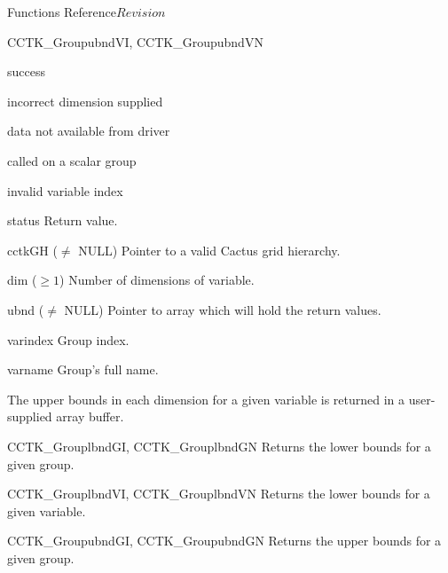 \begin{cactuspart}{ Functions Reference}{}{$Revision$}
\begin{FunctionDescription}{CCTK\_GroupubndVI, CCTK\_GroupubndVN}
\begin{ResultSection}
\begin{Result}{0} success \end{Result}
\begin{Result}{-1} incorrect dimension supplied \end{Result}
\begin{Result}{-2} data not available from driver \end{Result}
\begin{Result}{-3} called on a scalar group \end{Result}
\begin{Result}{-4} invalid variable index \end{Result}
\end{ResultSection}

\begin{ParameterSection}
\begin{Parameter}{status} Return value. \end{Parameter}
\begin{Parameter}{cctkGH ($\ne$ NULL)} Pointer to a valid Cactus grid hierarchy. \end{Parameter}
\begin{Parameter}{dim ($\ge 1$)} Number of dimensions of variable. \end{Parameter}
\begin{Parameter}{ubnd ($\ne$ NULL)} Pointer to array which will hold the return values. \end{Parameter}
\begin{Parameter}{varindex} Group index. \end{Parameter}
\begin{Parameter}{varname} Group's full name. \end{Parameter}
\end{ParameterSection}

\begin{Discussion}
The upper bounds in each dimension for a given variable is returned in a user-supplied array buffer.
\end{Discussion}

\begin{SeeAlsoSection}
\begin{SeeAlso}{CCTK\_GrouplbndGI, CCTK\_GrouplbndGN}
Returns the lower bounds for a given group.
\end{SeeAlso}
\begin{SeeAlso}{CCTK\_GrouplbndVI, CCTK\_GrouplbndVN}
Returns the lower bounds for a given variable.
\end{SeeAlso}
\begin{SeeAlso}{CCTK\_GroupubndGI, CCTK\_GroupubndGN}
Returns the upper bounds for a given group.
\end{SeeAlso}
\end{SeeAlsoSection}
\end{FunctionDescription}



\end{cactuspart}
